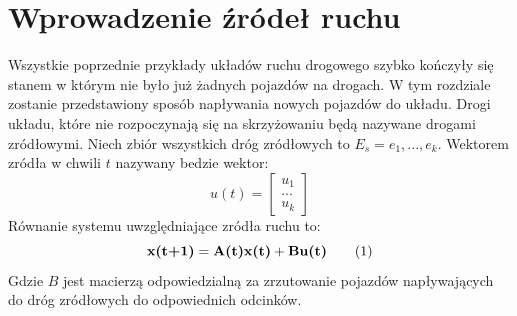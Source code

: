 \documentclass[12pt]{book}
\theoremstyle{plain}
\newcommand\addtag{\refstepcounter{equation}
\renewcommand{\labelenumii}{\theenumii}
\renewcommand{\theenumii}{\theenumi.\arabic{enumii}.}
\tag{\theequation}}
\begin{document}
\section{Wprowadzenie źródeł ruchu }
Wszystkie poprzednie przykłady układów ruchu drogowego szybko kończyły się stanem w którym nie było już żadnych pojazdów na drogach. W tym rozdziale zostanie przedstawiony sposób napływania nowych pojazdów do układu. Drogi układu, które nie rozpoczynają się na skrzyżowaniu będą nazywane drogami zródłowymi. Niech zbiór wszystkich dróg zródłowych to $E_s={e_1,...,e_k}$. Wektorem zródła w chwili $t$ nazywany bedzie wektor:
\[u(t)=\begin{bmatrix} u_1 \\ ... \\ u_k \end{bmatrix} \]
Równanie systemu uwzględniające zródła ruchu to:
\[\textbf{x(t+1)}=\textbf{A(t)x(t)} + \textbf{Bu(t)} \label{eq:stan_u}   \addtag{}\]
Gdzie $B$ jest macierzą odpowiedzialną za zrzutowanie pojazdów napływających do dróg zródłowych do odpowiednich odcinków.
\end{document}
